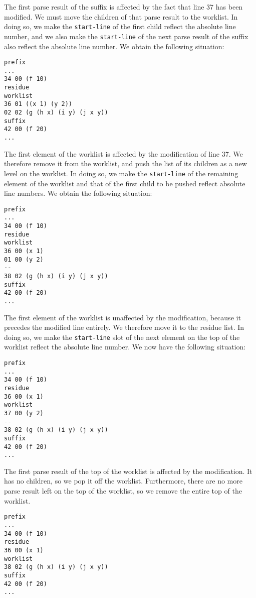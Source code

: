 The first parse result of the suffix is affected by the fact that line
37 has been modified.  We must move the children of that parse result
to the worklist.  In doing so, we make the \texttt{start-line} of the
first child reflect the absolute line number, and we also make the
\texttt{start-line} of the next parse result of the suffix also
reflect the absolute line number.  We obtain the following situation:

\begin{verbatim}
prefix
...
34 00 (f 10)
residue
worklist
36 01 ((x 1) (y 2))
02 02 (g (h x) (i y) (j x y))
suffix
42 00 (f 20)
...
\end{verbatim}

The first element of the worklist is affected by the modification of
line 37.  We therefore remove it from the worklist, and push the list
of its children as a new level on the worklist.  In doing so, we make
the \texttt{start-line} of the remaining element of the worklist and
that of the first child to be pushed reflect absolute line numbers.
We obtain the following situation:

\begin{verbatim}
prefix
...
34 00 (f 10)
residue
worklist
36 00 (x 1)
01 00 (y 2)
--
38 02 (g (h x) (i y) (j x y))
suffix
42 00 (f 20)
...
\end{verbatim}

The first element of the worklist is unaffected by the modification,
because it precedes the modified line entirely.  We therefore move it
to the residue list.  In doing so, we make the \texttt{start-line}
slot of the next element on the top of the worklist reflect the
absolute line number.  We now have the following situation:

\begin{verbatim}
prefix
...
34 00 (f 10)
residue
36 00 (x 1)
worklist
37 00 (y 2)
--
38 02 (g (h x) (i y) (j x y))
suffix
42 00 (f 20)
...
\end{verbatim}

The first parse result of the top of the worklist is affected by the
modification.  It has no children, so we pop it off the worklist.
Furthermore, there are no more parse result left on the top of the
worklist, so we remove the entire top of the worklist.

\begin{verbatim}
prefix
...
34 00 (f 10)
residue
36 00 (x 1)
worklist
38 02 (g (h x) (i y) (j x y))
suffix
42 00 (f 20)
...
\end{verbatim}

